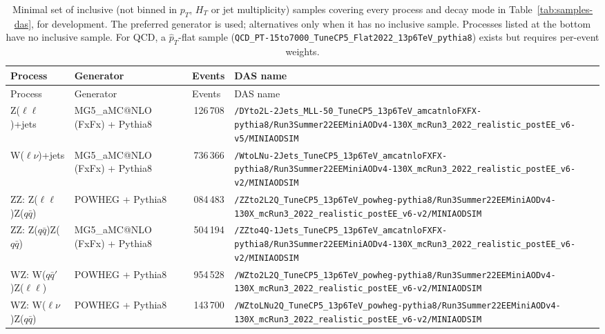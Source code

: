 \begin{landscape}
\footnotesize
\setlength{\tabcolsep}{3pt}
\begin{longtable}{@{}>{\raggedright\arraybackslash}p{3.2cm}>{\raggedright\arraybackslash}p{3.6cm}>{\raggedleft\arraybackslash}p{1.6cm}>{\raggedright\arraybackslash}p{13.5cm}@{}}
    \caption{Minimal set of inclusive (not binned in $p_T$, $H_T$ or jet multiplicity) samples covering every process and decay mode in Table~\ref{tab:samples-das}, for development. The preferred generator is used; alternatives only when it has no inclusive sample. Processes listed at the bottom have no inclusive sample. For QCD, a $\hat p_T$-flat sample (\nolinkurl{QCD_PT-15to7000_TuneCP5_Flat2022_13p6TeV_pythia8}) exists but requires per-event weights.\label{tab:samples-incl}} \\
    \toprule
    Process & Generator & Events & DAS name \\
    \midrule
    \endfirsthead
    \toprule
    Process & Generator & Events & DAS name \\
    \midrule
    \endhead
    \bottomrule
    \endlastfoot
Z($\ell\ell$)+jets & MG5\_aMC@NLO (FxFx) + Pythia8 & 336\,126\,708 & \nolinkurl{/DYto2L-2Jets_MLL-50_TuneCP5_13p6TeV_amcatnloFXFX-pythia8/Run3Summer22EEMiniAODv4-130X_mcRun3_2022_realistic_postEE_v6-v5/MINIAODSIM} \\
W($\ell\nu$)+jets & MG5\_aMC@NLO (FxFx) + Pythia8 & 268\,736\,366 & \nolinkurl{/WtoLNu-2Jets_TuneCP5_13p6TeV_amcatnloFXFX-pythia8/Run3Summer22EEMiniAODv4-130X_mcRun3_2022_realistic_postEE_v6-v2/MINIAODSIM} \\
ZZ: Z($\ell\ell$)Z($q\bar q$) & POWHEG + Pythia8 & 49\,084\,483 & \nolinkurl{/ZZto2L2Q_TuneCP5_13p6TeV_powheg-pythia8/Run3Summer22EEMiniAODv4-130X_mcRun3_2022_realistic_postEE_v6-v2/MINIAODSIM} \\
ZZ: Z($q\bar q$)Z($q\bar q$) & MG5\_aMC@NLO (FxFx) + Pythia8 & 3\,504\,194 & \nolinkurl{/ZZto4Q-1Jets_TuneCP5_13p6TeV_amcatnloFXFX-pythia8/Run3Summer22EEMiniAODv4-130X_mcRun3_2022_realistic_postEE_v6-v2/MINIAODSIM} \\
WZ: W($q\bar q'$)Z($\ell\ell$) & POWHEG + Pythia8 & 14\,954\,528 & \nolinkurl{/WZto2L2Q_TuneCP5_13p6TeV_powheg-pythia8/Run3Summer22EEMiniAODv4-130X_mcRun3_2022_realistic_postEE_v6-v2/MINIAODSIM} \\
WZ: W($\ell\nu$)Z($q\bar q$) & POWHEG + Pythia8 & 30\,143\,700 & \nolinkurl{/WZtoLNu2Q_TuneCP5_13p6TeV_powheg-pythia8/Run3Summer22EEMiniAODv4-130X_mcRun3_2022_realistic_postEE_v6-v2/MINIAODSIM} \\

\end{longtable}
\end{landscape}

